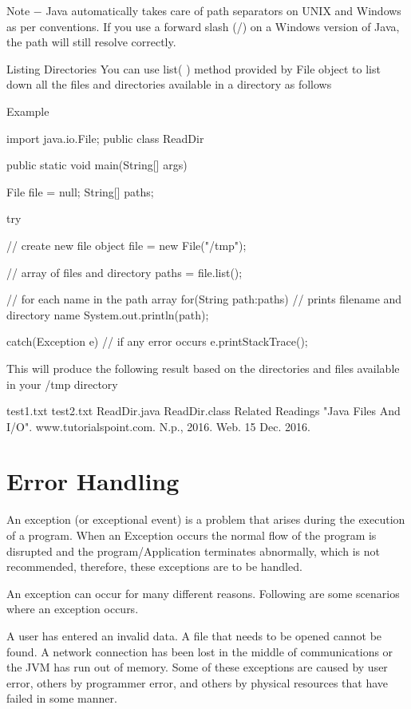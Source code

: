 Note − Java automatically takes care of path separators on UNIX and Windows as per conventions. If you use a forward slash (/) on a Windows version of Java, the path will still resolve correctly.

Listing Directories
You can use list( ) method provided by File object to list down all the files and directories available in a directory as follows

Example

import java.io.File;
public class ReadDir {

   public static void main(String[] args) {
      File file = null;
      String[] paths;

      try {
         // create new file object
         file = new File("/tmp");

         // array of files and directory
         paths = file.list();

         // for each name in the path array
         for(String path:paths) {
            // prints filename and directory name
            System.out.println(path);
         }
      }catch(Exception e) {
         // if any error occurs
         e.printStackTrace();
      }
   }
}
This will produce the following result based on the directories and files available in your /tmp directory

test1.txt
test2.txt
ReadDir.java
ReadDir.class
Related Readings
"Java Files And I/O". www.tutorialspoint.com. N.p., 2016. Web. 15 Dec. 2016.

\chapter{Error Handling}

An exception (or exceptional event) is a problem that arises during the execution of a program. When an Exception occurs the normal flow of the program is disrupted and the program/Application terminates abnormally, which is not recommended, therefore, these exceptions are to be handled.

An exception can occur for many different reasons. Following are some scenarios where an exception occurs.

A user has entered an invalid data.
A file that needs to be opened cannot be found.
A network connection has been lost in the middle of communications or the JVM has run out of memory.
Some of these exceptions are caused by user error, others by programmer error, and others by physical resources that have failed in some manner.

